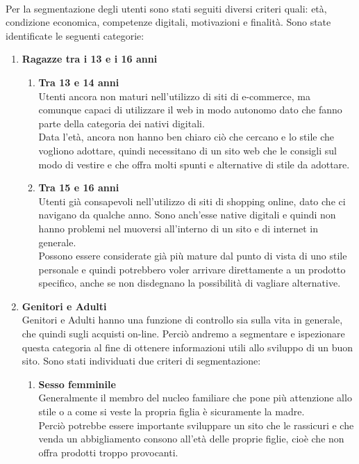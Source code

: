 \documentclass[12pt,a4paper]{report}
\begin{document}
\paragraph{}Per la segmentazione degli utenti sono stati seguiti diversi criteri quali:
 età, condizione economica, competenze digitali, motivazioni e finalità.
\newpage
 Sono state identificate le seguenti categorie:
 \begin{enumerate}
   \item \textbf{Ragazze tra i 13 e i 16 anni}
   \begin{enumerate}[label=\alph*.]
     \item \textbf{Tra 13 e 14 anni}\\
     Utenti ancora non maturi nell'utilizzo di siti di e-commerce, ma comunque capaci di utilizzare il web in modo autonomo dato che fanno parte della categoria dei nativi digitali.\\
     Data l'età, ancora non hanno ben chiaro ciò che cercano e lo stile che vogliono adottare, quindi necessitano di un sito web che le consigli sul modo di vestire e che offra molti spunti e alternative di stile da adottare.
     \item \textbf{Tra 15 e 16 anni}\\
     Utenti già consapevoli nell'utilizzo di siti di shopping online, dato che ci navigano da qualche anno. Sono anch'esse native digitali e quindi non hanno problemi nel muoversi all'interno di un sito e di internet in generale.\\
     Possono essere considerate già più mature dal punto di vista di uno stile personale e quindi potrebbero voler arrivare direttamente a un prodotto specifico, anche se non disdegnano la possibilità di vagliare alternative.
   \end{enumerate}
   \item \textbf{Genitori e Adulti}\\
   Genitori e Adulti hanno una funzione di controllo sia sulla vita in generale, che quindi sugli acquisti on-line. Perciò andremo a segmentare e ispezionare questa categoria al fine di ottenere informazioni utili allo sviluppo di un buon sito.
   Sono stati individuati due criteri di segmentazione:
   \begin{enumerate}[label=\alph*.]
   \item \textbf{Sesso femminile}\\
   Generalmente il membro del nucleo familiare che pone più attenzione allo stile o a come si veste la propria figlia è sicuramente la madre.\\ Perciò potrebbe essere importante sviluppare un sito che le rassicuri e che venda un abbigliamento consono all'età delle proprie figlie, cioè che non offra prodotti troppo provocanti.

\end{enumerate}
\end{enumerate}
\end{document}
